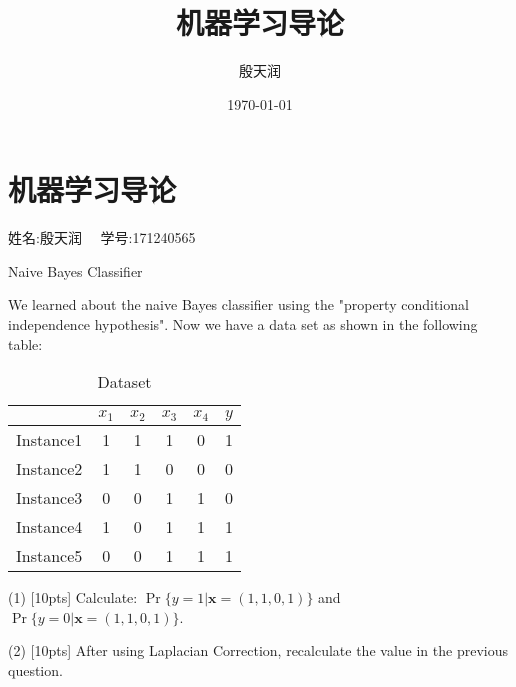 \documentclass[11pt, a4paper, UTF8]{ctexart}
\title{机器学习导论}
\author{殷天润}
\date{\today}
\begin{document}
                                                                                                                

\section {机器学习导论}

\begin{center} 姓名:殷天润 ~~学号:171240565\end{center}
\begin{problem}[ML problem 1]
	[20pts] Naive Bayes Classifier

		
	We learned about the naive Bayes classifier using the "property conditional independence hypothesis". Now we have a data set as shown in the following table:
	\begin{table}[htp]
		\centering
		\caption{Dataset}\label{tab:aStrangeTable}
	\begin{tabular}{c|ccccc}
		\hline 
		& $x_1$ & $x_2$ & $x_3$ & $x_4$ & $y$ \\ 
		\hline 
	Instance1	& 1 & 1 & 1 & 0 & 1 \\ 
		\hline 
	Instance2	& 1 & 1 & 0 & 0 & 0 \\ 
		\hline 
	Instance3	& 0 & 0 & 1 & 1 & 0 \\ 
		\hline 
	Instance4	& 1 & 0 & 1 & 1 & 1 \\ 
		\hline 
	Instance5	& 0 & 0 & 1 & 1 & 1 \\ 
		\hline 
	\end{tabular}
	\end{table} 
	

		(1) [10pts]  Calculate: $\Pr\{ y=1 | \mathbf{x}=(1,1,0,1) \}$ and $\Pr\{ y=0 | \mathbf{x}=(1,1,0,1) \}$.
		
		(2) [10pts] After using Laplacian Correction, recalculate the value in the previous question.
		
\end{problem}
\end{document}
